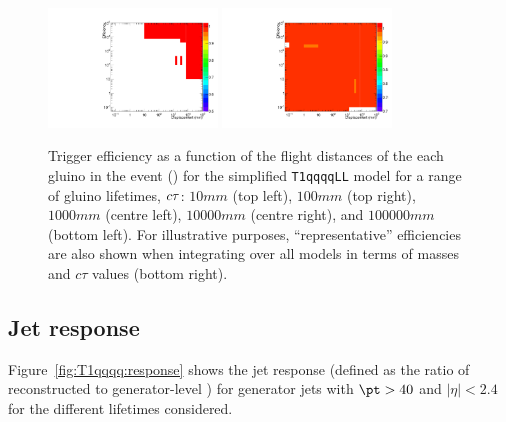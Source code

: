 \begin{figure}[h!]
\begin{center}
    \includegraphics[width=0.4\textwidth]{figures/LLPResults/systs/trigger/Signal_SignalModels__longLivedAnalyzer__SMS-T1qqqqLL_ctau_100000_mGluino-1000_mLSP-200_25ns__eff_trigger_2D_log_num.pdf} 
    \includegraphics[width=0.4\textwidth]{figures/LLPResults/systs/trigger/Signal_SignalModels__longLivedAnalyzer__SMS_T1qqqqLL_ctau-all__eff_trigger_2D_log_num.pdf} 
    \caption{Trigger efficiency as a function of the flight distances
      of the each gluino in the event () for the simplified \texttt{T1qqqqLL} model for a
      range of gluino lifetimes, $c\tau$: $10\unit{mm}$ (top left),
      $100\unit{mm}$ (top right), $1000\unit{mm}$ (centre left),
      $10000\unit{mm}$ (centre right), and $100000\unit{mm}$ (bottom
      left). For illustrative purposes, ``representative''
      efficiencies are also shown when integrating over all models in
      terms of masses and $c\tau$ values (bottom right).  }
    \label{fig:triggereffs}
  \end{center}
\end{figure}

\clearpage
\subsection{Jet response}
\label{app:LLP-jetresponse}

Figure~\ref{fig:T1qqqq:response} shows the jet response (defined as
the ratio of reconstructed \pt to generator-level \pt) for generator
jets with $\pt>40$ and $|\eta|<2.4$ for the different lifetimes
considered.


